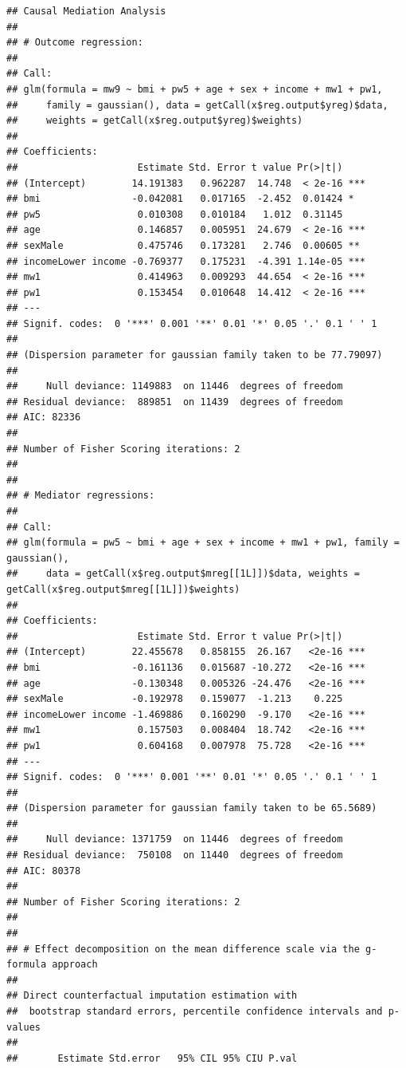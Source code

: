 \documentclass[
]{book}
\begin{document}
\begin{verbatim}
## Causal Mediation Analysis
## 
## # Outcome regression:
## 
## Call:
## glm(formula = mw9 ~ bmi + pw5 + age + sex + income + mw1 + pw1, 
##     family = gaussian(), data = getCall(x$reg.output$yreg)$data, 
##     weights = getCall(x$reg.output$yreg)$weights)
## 
## Coefficients:
##                     Estimate Std. Error t value Pr(>|t|)    
## (Intercept)        14.191383   0.962287  14.748  < 2e-16 ***
## bmi                -0.042081   0.017165  -2.452  0.01424 *  
## pw5                 0.010308   0.010184   1.012  0.31145    
## age                 0.146857   0.005951  24.679  < 2e-16 ***
## sexMale             0.475746   0.173281   2.746  0.00605 ** 
## incomeLower income -0.769377   0.175231  -4.391 1.14e-05 ***
## mw1                 0.414963   0.009293  44.654  < 2e-16 ***
## pw1                 0.153454   0.010648  14.412  < 2e-16 ***
## ---
## Signif. codes:  0 '***' 0.001 '**' 0.01 '*' 0.05 '.' 0.1 ' ' 1
## 
## (Dispersion parameter for gaussian family taken to be 77.79097)
## 
##     Null deviance: 1149883  on 11446  degrees of freedom
## Residual deviance:  889851  on 11439  degrees of freedom
## AIC: 82336
## 
## Number of Fisher Scoring iterations: 2
## 
## 
## # Mediator regressions: 
## 
## Call:
## glm(formula = pw5 ~ bmi + age + sex + income + mw1 + pw1, family = gaussian(), 
##     data = getCall(x$reg.output$mreg[[1L]])$data, weights = getCall(x$reg.output$mreg[[1L]])$weights)
## 
## Coefficients:
##                     Estimate Std. Error t value Pr(>|t|)    
## (Intercept)        22.455678   0.858155  26.167   <2e-16 ***
## bmi                -0.161136   0.015687 -10.272   <2e-16 ***
## age                -0.130348   0.005326 -24.476   <2e-16 ***
## sexMale            -0.192978   0.159077  -1.213    0.225    
## incomeLower income -1.469886   0.160290  -9.170   <2e-16 ***
## mw1                 0.157503   0.008404  18.742   <2e-16 ***
## pw1                 0.604168   0.007978  75.728   <2e-16 ***
## ---
## Signif. codes:  0 '***' 0.001 '**' 0.01 '*' 0.05 '.' 0.1 ' ' 1
## 
## (Dispersion parameter for gaussian family taken to be 65.5689)
## 
##     Null deviance: 1371759  on 11446  degrees of freedom
## Residual deviance:  750108  on 11440  degrees of freedom
## AIC: 80378
## 
## Number of Fisher Scoring iterations: 2
## 
## 
## # Effect decomposition on the mean difference scale via the g-formula approach
##  
## Direct counterfactual imputation estimation with 
##  bootstrap standard errors, percentile confidence intervals and p-values 
##  
##       Estimate Std.error   95% CIL 95% CIU P.val   

\end{verbatim}
\end{document}
